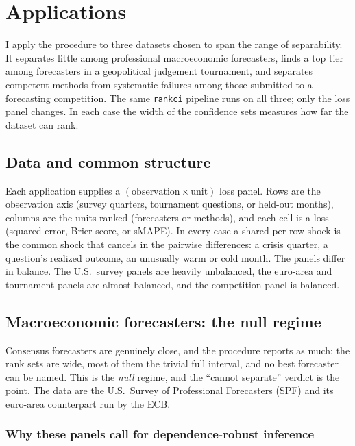\chapter{Applications}
\label{ch:apps}

I apply the procedure to three datasets chosen to span the range of separability. It
separates little among professional macroeconomic forecasters, finds a top tier among
forecasters in a geopolitical judgement tournament, and separates competent methods from
systematic failures among those submitted to a forecasting competition. The same
\texttt{rankci} pipeline runs on all three; only the loss panel changes. In each case
the width of the confidence sets measures how far the dataset can rank.

\section{Data and common structure}
\label{sec:apps-setup}

Each application supplies a $(\text{observation}\times\text{unit})$ loss panel. Rows are
the observation axis (survey quarters, tournament questions, or held-out months), columns
are the units ranked (forecasters or methods), and each cell is a loss (squared error,
Brier score, or sMAPE). In every case a shared per-row shock is the common shock that
cancels in the pairwise differences: a crisis quarter, a question's realized outcome, an
unusually warm or cold month. The panels differ in balance. The U.S.\ survey panels are
heavily unbalanced, the euro-area and tournament panels are almost balanced, and the
competition panel is balanced.

\section{Macroeconomic forecasters: the null regime}
\label{sec:apps-macro}

Consensus forecasters are genuinely close, and the procedure reports as much: the rank
sets are wide, most of them the trivial full interval, and no best forecaster can be
named. This is the \emph{null} regime, and the ``cannot separate'' verdict is the point.
The data are the U.S.\ Survey of Professional Forecasters (SPF) and its euro-area
counterpart run by the ECB.

\subsection{Why these panels call for dependence-robust inference}
\label{sec:apps-spf-dependence}

